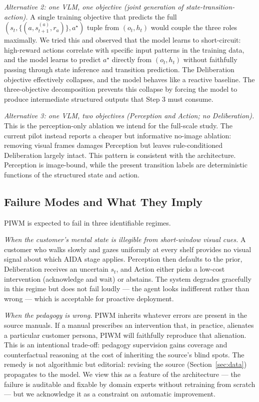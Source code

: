 \documentclass{article}
\begin{document}
\textit{Alternative 2: one VLM, one objective (joint generation of state-transition-action).}
A single training objective that predicts the full $(s_t, \{(a, s_{t+1}^{(a)}, r_a)\}, a^\star)$ tuple from $(o_t, h_t)$ would couple the three roles maximally. We tried this and observed that the model learns to short-circuit: high-reward actions correlate with specific input patterns in the training data, and the model learns to predict $a^\star$ directly from $(o_t, h_t)$ without faithfully passing through state inference and transition prediction. The Deliberation objective effectively collapses, and the model behaves like a reactive baseline. The three-objective decomposition prevents this collapse by forcing the model to produce intermediate structured outputs that Step 3 must consume.

\textit{Alternative 3: one VLM, two objectives (Perception and Action; no Deliberation).}
This is the perception-only ablation we intend for the full-scale study. The current pilot instead reports a cheaper but informative no-image ablation: removing visual frames damages Perception but leaves rule-conditioned Deliberation largely intact. This pattern is consistent with the architecture. Perception is image-bound, while the present transition labels are deterministic functions of the structured state and action.

\subsection{Failure Modes and What They Imply}
\label{sec:method:failure}

PIWM is expected to fail in three identifiable regimes.

\textit{When the customer's mental state is illegible from short-window visual cues.}
A customer who walks slowly and gazes uniformly at every shelf provides no visual signal about which AIDA stage applies. Perception then defaults to the prior, Deliberation receives an uncertain $s_t$, and Action either picks a low-cost intervention (acknowledge and wait) or abstains. The system degrades gracefully in this regime but does not fail loudly --- the agent looks indifferent rather than wrong --- which is acceptable for proactive deployment.

\textit{When the pedagogy is wrong.}
PIWM inherits whatever errors are present in the source manuals. If a manual prescribes an intervention that, in practice, alienates a particular customer persona, PIWM will faithfully reproduce that alienation. This is an intentional trade-off: pedagogy supervision gains coverage and counterfactual reasoning at the cost of inheriting the source's blind spots. The remedy is not algorithmic but editorial: revising the source (Section~\ref{sec:data}) propagates to the model. We view this as a feature of the architecture --- the failure is auditable and fixable by domain experts without retraining from scratch --- but we acknowledge it as a constraint on automatic improvement.
\end{document}
